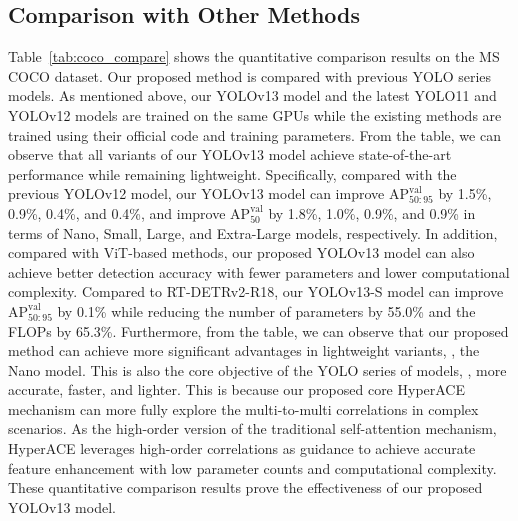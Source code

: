 \subsection{Comparison with Other Methods}
\label{sec:cmp}
Table~\ref{tab:coco_compare} shows the quantitative comparison results on the MS COCO dataset. Our proposed method is compared with previous YOLO series models. As mentioned above, our YOLOv13 model and the latest YOLO11 and YOLOv12 models are trained on the same GPUs while the existing methods are trained using their official code and training parameters. From the table, we can observe that all variants of our YOLOv13 model achieve state-of-the-art performance while remaining lightweight. Specifically, compared with the previous YOLOv12 model, our YOLOv13 model can improve $\text{AP}_{50:95}^\text{val}$ by 1.5\%, 0.9\%, 0.4\%, and 0.4\%, and improve $\text{AP}_{50}^\text{val}$ by 1.8\%, 1.0\%, 0.9\%, and 0.9\% in terms of Nano, Small, Large, and Extra-Large models, respectively. In addition, compared with ViT-based methods, our proposed YOLOv13 model can also achieve better detection accuracy with fewer parameters and lower computational complexity. Compared to RT-DETRv2-R18, our YOLOv13-S model can improve $\text{AP}_{50:95}^\text{val}$ by 0.1\% while reducing the number of parameters by 55.0\% and the FLOPs by 65.3\%. Furthermore, from the table, we can observe that our proposed method can achieve more significant advantages in lightweight variants, \eg, the Nano model. This is also the core objective of the YOLO series of models, \ie, more accurate, faster, and lighter. This is because our proposed core HyperACE mechanism can more fully explore the multi-to-multi correlations in complex scenarios. As the high-order version of the traditional self-attention mechanism, HyperACE leverages high-order correlations as guidance to achieve accurate feature enhancement with low parameter counts and computational complexity. These quantitative comparison results prove the effectiveness of our proposed YOLOv13 model.





